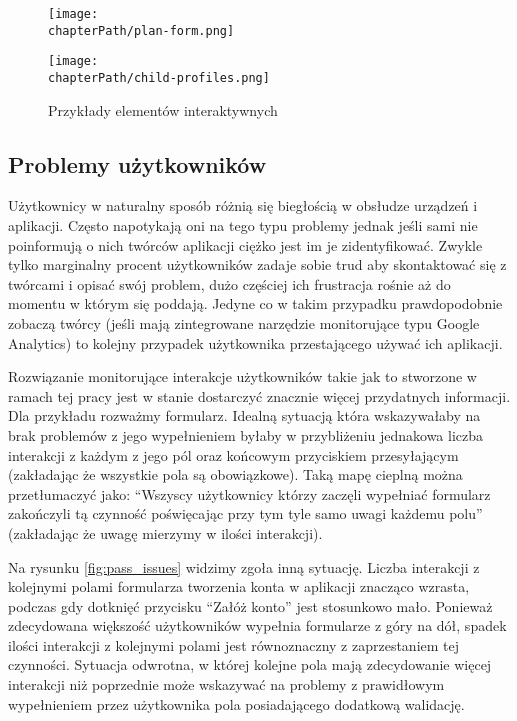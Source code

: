 \bigskip
\begin{figure}[H]
\centering
\begin{minipage}{.3\textwidth}
	\centering
	\texttt{[image: \\chapterPath/plan-form.png]}
\end{minipage}
\begin{minipage}{.4\textwidth}
	\centering
	\texttt{[image: \\chapterPath/child-profiles.png]}
\end{minipage}
\bigskip
\caption{Przykłady elementów interaktywnych}
\label{fig:interactive_areas}
\end{figure}

\subsection{Problemy użytkowników}
Użytkownicy w naturalny sposób różnią się biegłością w obsłudze urządzeń i aplikacji. Często napotykają oni na tego typu problemy jednak jeśli sami nie poinformują o nich twórców aplikacji ciężko jest im je zidentyfikować. Zwykle tylko marginalny procent użytkowników zadaje sobie trud aby skontaktować się z twórcami i opisać swój problem, dużo częściej ich frustracja rośnie aż do momentu w którym się poddają. Jedyne co w takim przypadku prawdopodobnie zobaczą twórcy (jeśli mają zintegrowane narzędzie monitorujące typu Google Analytics) to kolejny przypadek użytkownika przestającego używać ich aplikacji. 

Rozwiązanie monitorujące interakcje użytkowników takie jak to stworzone w ramach tej pracy jest w stanie dostarczyć znacznie więcej przydatnych informacji. Dla przykładu rozważmy formularz. Idealną sytuacją która wskazywałaby na brak problemów z jego wypełnieniem byłaby w przybliżeniu jednakowa liczba interakcji z każdym z jego pól oraz końcowym przyciskiem przesyłającym (zakładając że wszystkie pola są obowiązkowe). Taką mapę cieplną można przetłumaczyć jako: ``Wszyscy użytkownicy którzy zaczęli wypełniać formularz zakończyli tą czynność poświęcając przy tym tyle samo uwagi każdemu polu'' (zakładając że uwagę mierzymy w ilości interakcji). 

Na rysunku \ref{fig:pass_issues} widzimy zgoła inną sytuację. Liczba interakcji z kolejnymi polami formularza tworzenia konta w aplikacji znacząco wzrasta, podczas gdy dotknięć przycisku ``Załóż konto'' jest stosunkowo mało. Ponieważ zdecydowana większość użytkowników wypełnia formularze z góry na dół, spadek ilości interakcji z kolejnymi polami jest równoznaczny z zaprzestaniem tej czynności. Sytuacja odwrotna, w której kolejne pola mają zdecydowanie więcej interakcji niż poprzednie może wskazywać na problemy z prawidłowym wypełnieniem przez użytkownika pola posiadającego dodatkową walidację. 

